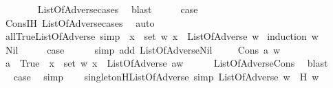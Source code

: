 \begin{isabellebody}
\ \ \ \ \ \ \isamarkupfalse%
\ ListOfAdverse{\isachardot}cases\ \isamarkupfalse%
\ blast\isanewline
\ \ \isamarkupfalse%
\ \isamarkupfalse%
\ {\isacharquery}case\isanewline
\ \ \ \ \isamarkupfalse%
\ Cons{\isachardot}IH\ ListOfAdverse{\isachardot}cases\ \isamarkupfalse%
\ auto\ \isanewline
{}\isamarkupfalse%
%
\endisatagproof
{\isafoldproof}%
%
\isadelimproof
\isanewline
%
\endisadelimproof
\ \ \isanewline
{}\isamarkupfalse%
\ all{\isacharunderscore}True{\isacharunderscore}ListOfAdverse\ {\isacharbrackleft}simp{\isacharbrackright}{\isacharcolon}\ {\isachardoublequoteopen}{\isacharparenleft}{\isasymforall}\ x\ {\isasymin}\ set\ w{\isachardot}\ x{\isacharparenright}\ {\isasymlongrightarrow}\ ListOfAdverse\ w{\isachardoublequoteclose}\isanewline
%
\isadelimproof
%
\endisadelimproof
%
\isatagproof
{}\isamarkupfalse%
\ {\isacharparenleft}induction\ w{\isacharparenright}\isanewline
\ \ \isamarkupfalse%
\ Nil\isanewline
\ \ \isamarkupfalse%
\ \isamarkupfalse%
\ {\isacharquery}case\isanewline
\ \ \ \ \isamarkupfalse%
\ {\isacharparenleft}simp\ add{\isacharcolon}\ ListOfAdverse{\isachardot}Nil{\isacharparenright}\ \isanewline
{}\isamarkupfalse%
\isanewline
\ \ \isamarkupfalse%
\ {\isacharparenleft}Cons\ a\ w{\isacharparenright}\isanewline
\ \ \isamarkupfalse%
\ \isamarkupfalse%
\ {\isachardoublequoteopen}a\ {\isacharequal}\ True\ {\isasymand}\ {\isacharparenleft}{\isasymforall}x\ {\isasymin}\ set\ w{\isachardot}\ x{\isacharparenright}\ {\isasymlongrightarrow}\ ListOfAdverse\ {\isacharparenleft}a{\isacharhash}w{\isacharparenright}{\isachardoublequoteclose}\isanewline
\ \ \ \ \isamarkupfalse%
\ ListOfAdverse{\isachardot}Cons\ \isamarkupfalse%
\ blast\ \isanewline
\ \ \isamarkupfalse%
\ \isamarkupfalse%
\ {\isacharquery}case\ \isamarkupfalse%
\ simp\isanewline
{}\isamarkupfalse%
%
\endisatagproof
{\isafoldproof}%
%
\isadelimproof
\isanewline
%
\endisadelimproof
\ \ \isanewline
{}\isamarkupfalse%
\ singleton{\isacharunderscore}H{\isacharunderscore}ListOfAdverse\ {\isacharbrackleft}simp{\isacharbrackright}{\isacharcolon}\ {\isachardoublequoteopen}ListOfAdverse\ w\ {\isasymlongrightarrow}\ H\ w\ {\isacharequal}\ {\isacharbraceleft}{}{\isacharbraceright}{\isachardoublequoteclose}\isanewline

\end{isabellebody}
